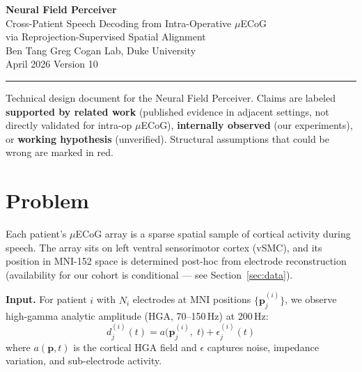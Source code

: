 \documentclass[11pt,letterpaper]{article}
\newcommand{\bfp}{\mathbf{p}}
\begin{document}
\begin{center}
{\LARGE\bfseries Neural Field Perceiver}\\[6pt]
{\large Cross-Patient Speech Decoding from Intra-Operative $\mu$ECoG\\via Reprojection-Supervised Spatial Alignment}\\[12pt]
{\normalsize Ben Tang \quad\textbar\quad Greg Cogan Lab, Duke University}\\[4pt]
{\normalsize April 2026 \quad\textbar\quad Version 10}
\end{center}

\medskip\noindent\rule{\textwidth}{0.4pt}\medskip

\noindent Technical design document for the Neural Field Perceiver.
Claims are labeled \textbf{supported by related work} (published evidence in adjacent settings, not directly validated for intra-op $\mu$ECoG), \textbf{internally observed} (our experiments), or \textbf{working hypothesis} (unverified).
Structural assumptions that could be wrong are marked in \textcolor{BrickRed}{red}.

\tableofcontents
\newpage



\section{Problem}\label{sec:problem}

Each patient's $\mu$ECoG array is a sparse spatial sample of cortical activity during speech. The array sits on left ventral sensorimotor cortex (vSMC), and its position in MNI-152 space is determined post-hoc from electrode reconstruction (availability for our cohort is conditional --- see Section~\ref{sec:data}).

\textbf{Input.} For patient $i$ with $N_i$ electrodes at MNI positions $\{\bfp_j^{(i)}\}$, we observe high-gamma analytic amplitude (HGA, 70--150\,Hz) at 200\,Hz:
\begin{equation}\label{eq:observation}
d_j^{(i)}(t) = a\bigl(\bfp_j^{(i)},\; t\bigr) + \epsilon_j^{(i)}(t)
\end{equation}
where $a(\bfp, t)$ is the cortical HGA field and $\epsilon$ captures noise, impedance variation, and sub-electrode activity.
\end{document}
